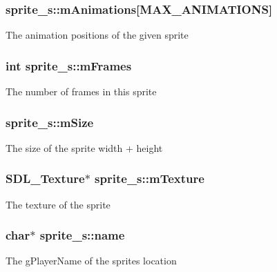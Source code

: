 \subsubsection[{\texorpdfstring{m\+Animations}{mAnimations}}]{ sprite\+\_\+s\+::m\+Animations\mbox{[}{\bf M\+A\+X\+\_\+\+A\+N\+I\+M\+A\+T\+I\+O\+NS}\mbox{]}}\hypertarget{structsprite__s_a99d8fe22b1f80e3df25c0c722abfb9ce}{}\label{structsprite__s_a99d8fe22b1f80e3df25c0c722abfb9ce}
The animation positions of the given sprite 
\subsubsection[{\texorpdfstring{m\+Frames}{mFrames}}]{\setlength{\rightskip}{0pt plus 5cm}int sprite\+\_\+s\+::m\+Frames}\hypertarget{structsprite__s_a3c33937a6472eb2c75de735cb838eb57}{}\label{structsprite__s_a3c33937a6472eb2c75de735cb838eb57}
The number of frames in this sprite 
\subsubsection[{\texorpdfstring{m\+Size}{mSize}}]{ sprite\+\_\+s\+::m\+Size}\hypertarget{structsprite__s_a2d4e640dfc835d00036c58bc5c36c85f}{}\label{structsprite__s_a2d4e640dfc835d00036c58bc5c36c85f}
The size of the sprite width + height 
\subsubsection[{\texorpdfstring{m\+Texture}{mTexture}}]{\setlength{\rightskip}{0pt plus 5cm}S\+D\+L\+\_\+\+Texture$\ast$ sprite\+\_\+s\+::m\+Texture}\hypertarget{structsprite__s_aa10951343a2acdd8a4b80db72ad7ef5c}{}\label{structsprite__s_aa10951343a2acdd8a4b80db72ad7ef5c}
The texture of the sprite 
\subsubsection[{\texorpdfstring{name}{name}}]{\setlength{\rightskip}{0pt plus 5cm}char$\ast$ sprite\+\_\+s\+::name}\hypertarget{structsprite__s_ab26c23fcaa6b5365629d2ddfaa5b9482}{}\label{structsprite__s_ab26c23fcaa6b5365629d2ddfaa5b9482}
The g\+Player\+Name of the sprite\textquotesingle{}s location 
